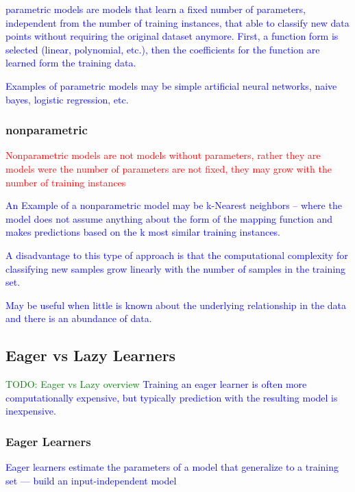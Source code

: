 \textcolor{blue}{parametric models are models that learn a fixed number of parameters, independent from the number of training instances, that able to classify new data points without requiring the original dataset anymore. First, a function form is selected (linear, polynomial, etc.), then the coefficients for the function are learned form the training data.}
	
\textcolor{blue}{Examples of parametric models may be simple artificial neural networks, naive bayes, logistic regression, etc.}

\subsubsection{nonparametric}

\textcolor{red}{Nonparametric models are not models without parameters, rather they are models were the number of parameters are not fixed, they may grow with the number of training instances}

\textcolor{blue}{An Example of a nonparametric model may be k-Nearest neighbors -- where the model does not assume anything about the form of the mapping function and makes predictions based on the k most similar training instances.}

\textcolor{blue}{A disadvantage to this type of approach is that the computational complexity for classifying new samples grow linearly with the number of samples in the training set.}

\textcolor{blue}{May be useful when little is known about the underlying relationship in the data and there is an abundance of data.}

\subsection{Eager vs Lazy Learners}

\textcolor{green}{TODO: Eager vs Lazy overview}
\textcolor{blue}{Training an eager learner is often more computationally expensive, but typically prediction with the resulting model is inexpensive.}

\subsubsection{Eager Learners}

\textcolor{blue}{Eager learners estimate the parameters of a model that generalize to a training set --- build an input-independent model}

